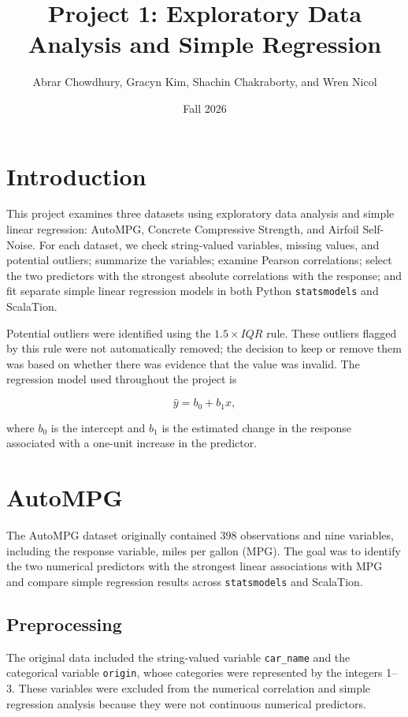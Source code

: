 \documentclass[11pt]{article}
\title{Project 1: Exploratory Data Analysis and Simple Regression}
\author{Abrar Chowdhury, Gracyn Kim, Shachin Chakraborty, and Wren Nicol}
\date{Fall 2026}
\begin{document}
\maketitle
\tableofcontents
\newpage

\section{Introduction}

This project examines three datasets using exploratory data analysis and simple
linear regression: AutoMPG, Concrete Compressive Strength, and Airfoil
Self-Noise. For each dataset, we check string-valued variables,
missing values, and potential outliers; summarize the variables; examine
Pearson correlations; select the two predictors with the strongest absolute
correlations with the response; and fit separate simple linear regression
models in both Python \texttt{statsmodels} and ScalaTion.

Potential outliers were identified using the $1.5\times IQR$ rule. These
outliers flagged by this rule were not automatically removed; the decision
to keep or remove them was based on whether there was evidence that the value
was invalid. The regression model used throughout the project is

\[
\widehat{y}=b_0+b_1x,
\]

where $b_0$ is the intercept and $b_1$ is the estimated change in the response
associated with a one-unit increase in the predictor.

\newpage
\section{AutoMPG}

The AutoMPG dataset originally contained 398 observations and nine variables,
including the response variable, miles per gallon (MPG). The goal was to
identify the two numerical predictors with the strongest linear associations
with MPG and compare simple regression results across \texttt{statsmodels} and
ScalaTion.

\subsection{Preprocessing}

The original data included the string-valued variable \texttt{car\_name} and
the categorical variable \texttt{origin}, whose categories were represented by
the integers 1--3. These variables were excluded from the numerical correlation
and simple regression analysis because they were not continuous numerical
predictors.
\end{document}
